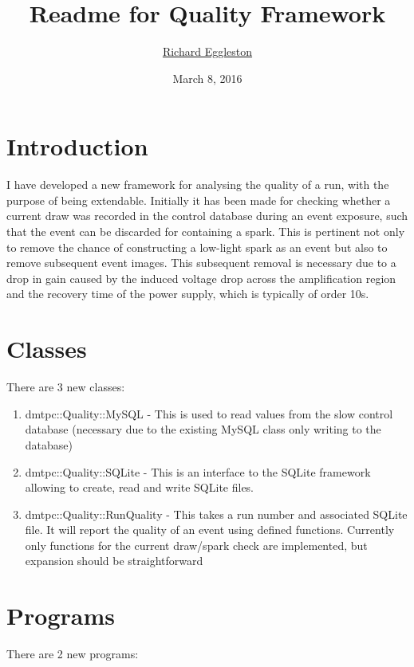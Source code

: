 \documentclass[12pt]{article}
\title{Readme for Quality Framework}
\author{\href{mailto:pwap022@live.rhul.ac.uk}{Richard Eggleston}}
\date{March 8, 2016}
\begin{document}
\maketitle

\section{Introduction}
I have developed a new framework for analysing the quality of a run, with the purpose of being extendable. Initially it has been made for checking whether a current draw was recorded in the control database during an event exposure, such that the event can be discarded for containing a spark. This is pertinent not only to remove the chance of constructing a low-light spark as an event but also to remove subsequent event images. This subsequent removal is necessary due to a drop in gain caused by the induced voltage drop across the amplification region and the recovery time of the power supply, which is typically of order 10s. 

\section{Classes}
There are 3 new classes: 

\begin{enumerate}
\item dmtpc::Quality::MySQL - This is used to read values from the slow control database (necessary due to the existing MySQL class only writing to the database)
\item dmtpc::Quality::SQLite - This is an interface to the SQLite framework allowing to create, read and write SQLite files. 
\item dmtpc::Quality::RunQuality - This takes a run number and associated SQLite file. It will report the quality of an event using defined functions. Currently only functions for the current draw/spark check are implemented, but expansion should be straightforward
\end{enumerate}

\section{Programs}
There are 2 new programs:
\end{document}
